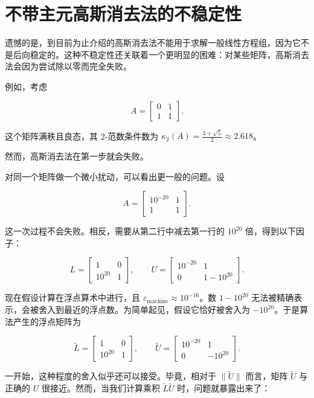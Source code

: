 \documentclass[UTF8,fontset=none,12pt]{ctexart}
\newcommand{\epsmach}{\varepsilon_{\mathrm{machine}}}
\theoremstyle{definition}
\begin{document}
\section*{不带主元高斯消去法的不稳定性}

遗憾的是，到目前为止介绍的高斯消去法不能用于求解一般线性方程组，因为它不是后向稳定的。这种不稳定性还关联着一个更明显的困难：对某些矩阵，高斯消去法会因为尝试除以零而完全失败。

例如，考虑

$$
A=\begin{bmatrix}0&1\\1&1\end{bmatrix}.
$$

这个矩阵满秩且良态，其 2-范数条件数为 $\kappa_2(A)=\frac{3+\sqrt5}{2}\approx2.618$。

然而，高斯消去法在第一步就会失败。

对同一个矩阵做一个微小扰动，可以看出更一般的问题。设

\begin{equation}
A=
\begin{bmatrix}
10^{-20}&1\\
1&1
\end{bmatrix}.
\tag{20.9}
\end{equation}

这一次过程不会失败。相反，需要从第二行中减去第一行的 $10^{20}$ 倍，得到以下因子：

$$
L=\begin{bmatrix}1&0\\10^{20}&1\end{bmatrix},
\qquad
U=\begin{bmatrix}10^{-20}&1\\0&1-10^{20}\end{bmatrix}.
$$

现在假设计算在浮点算术中进行，且 $\epsmach\approx10^{-16}$。数 $1-10^{20}$ 无法被精确表示，会被舍入到最近的浮点数。为简单起见，假设它恰好被舍入为 $-10^{20}$。于是算法产生的浮点矩阵为

$$
\widetilde{L}=\begin{bmatrix}1&0\\10^{20}&1\end{bmatrix},
\qquad
\widetilde{U}=\begin{bmatrix}10^{-20}&1\\0&-10^{20}\end{bmatrix}.
$$

一开始，这种程度的舍入似乎还可以接受。毕竟，相对于 $\|\widetilde U\|$ 而言，矩阵 $\widetilde U$ 与正确的 $U$ 很接近。然而，当我们计算乘积 $\widetilde L\widetilde U$ 时，问题就暴露出来了：
\end{document}
